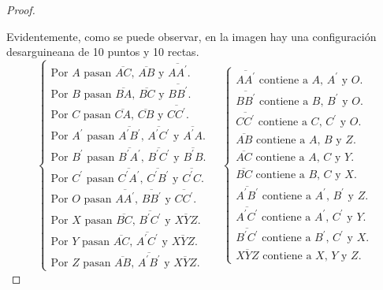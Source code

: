 \documentclass[12pt,a4paper]{article}
\theoremstyle{break}
\newtheorem*{proof}{Solución}
\begin{document}
\begin{proof}
\begin{center}
	\end{center}
	\noindent Evidentemente, como se puede observar, en la imagen hay una
	configuración desarguineana de 10 puntos y 10 rectas.
	\[
		\begin{cases}
			\text{Por $A$ pasan $\overline{AC}$, $\overline{AB}$ y
			$\overline{AA^\prime}$.} \\
			\text{Por $B$ pasan $\overline{BA}$, $\overline{BC}$ y
			$\overline{BB^\prime}$.} \\
			\text{Por $C$ pasan $\overline{CA}$, $\overline{CB}$ y
			$\overline{CC^\prime}$.} \\
			\text{Por $A^\prime$ pasan $\overline{A^\prime B^\prime}$,
			$\overline{A^\prime C^\prime}$ y $\overline{A^\prime A}$.} \\
			\text{Por $B^\prime$ pasan $\overline{B^\prime A^\prime}$,
			$\overline{B^\prime C^\prime}$ y $\overline{B^\prime B}$.} \\
			\text{Por $C^\prime$ pasan $\overline{C^\prime A^\prime}$,
			$\overline{C^\prime B^\prime}$ y $\overline{C^\prime C}$.} \\
			\text{Por $O$ pasan $\overline{AA^\prime}$,
			$\overline{BB^\prime}$ y $\overline{CC^\prime}$.} \\
			\text{Por $X$ pasan $\overline{BC}$,
			$\overline{B^\prime C^\prime}$ y $\overline{XYZ}$.} \\
			\text{Por $Y$ pasan $\overline{AC}$,
			$\overline{A^\prime C^\prime}$ y $\overline{XYZ}$.} \\
			\text{Por $Z$ pasan $\overline{AB}$,
			$\overline{A^\prime B^\prime}$ y $\overline{XYZ}$.}
		\end{cases}
		\quad
		\begin{cases}
			\text{$\overline{AA^\prime}$ contiene a $A$, $A^\prime$ y
			$O$.} \\
			\text{$\overline{BB^\prime}$ contiene a $B$, $B^\prime$ y
			$O$.} \\
			\text{$\overline{CC^\prime}$ contiene a $C$, $C^\prime$ y
			$O$.} \\
			\text{$\overline{AB}$ contiene a $A$, $B$ y $Z$.} \\
			\text{$\overline{AC}$ contiene a $A$, $C$ y $Y$.} \\
			\text{$\overline{BC}$ contiene a $B$, $C$ y $X$.} \\
			\text{$\overline{A^\prime B^\prime}$ contiene a $A^\prime$,
			$B^\prime$ y $Z$.} \\
			\text{$\overline{A^\prime C^\prime}$ contiene a $A^\prime$,
			$C^\prime$ y $Y$.} \\
			\text{$\overline{B^\prime C^\prime}$ contiene a $B^\prime$,
			$C^\prime$ y $X$.} \\
			\text{$\overline{XYZ}$ contiene a $X$, $Y$ y $Z$.}
		\end{cases}
	\]
\end{proof}
\end{document}
